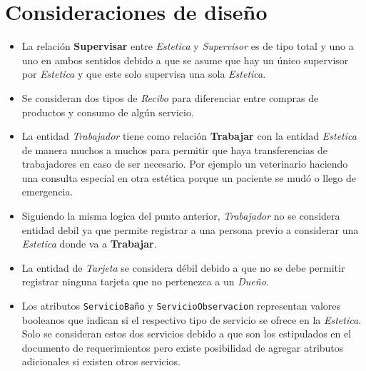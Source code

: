 \documentclass{exam}
\begin{document}
\section*{Consideraciones de diseño}

\begin{itemize}
	\item La relación \textbf{Supervisar} entre \textit{Estetica} y \textit{Supervisor} es de tipo total y uno a uno en ambos sentidos debido a que se asume que hay un único supervisor por \textit{Estetica} y que este solo supervisa una sola \textit{Estetica}.
	\item Se consideran dos tipos de \textit{Recibo} para diferenciar entre compras de productos y consumo de algún servicio.
	\item La entidad \textit{Trabajador} tiene como relación \textbf{Trabajar} con la entidad \textit{Estetica} de manera muchos a muchos para permitir que haya transferencias de trabajadores en caso de ser necesario. Por ejemplo un veterinario haciendo una consulta especial en otra estética porque un paciente se mudó o llego de emergencia.
	\item Siguiendo la misma logica del punto anterior, \textit{Trabajador} no se considera entidad debil ya que permite registrar a una persona previo a considerar una \textit{Estetica} donde va a \textbf{Trabajar}.
	\item La entidad de \textit{Tarjeta} se considera débil debido a que no se debe permitir registrar ninguna tarjeta que no pertenezca a un \textit{Dueño}.
	\item Los atributos \texttt{ServicioBaño} y \texttt{ServicioObservacion} representan valores booleanos que indican si el respectivo tipo de servicio se ofrece en la \textit{Estetica}. Solo se consideran estos dos servicios debido a que son los estipulados en el documento de requerimientos pero existe posibilidad de agregar atributos adicionales si existen otros servicios.
\end{itemize}
\end{document}

